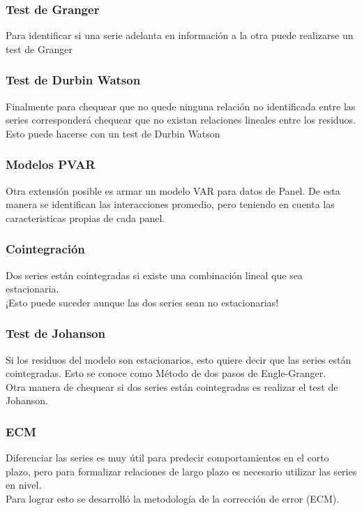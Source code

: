 \documentclass{beamer}
\begin{document}
\begin{frame}
\frametitle{Test de Granger}
Para identificar si una serie adelanta en información a la otra puede realizarse un test de Granger
\end{frame}


\begin{frame}
\frametitle{Test de Durbin Watson}
Finalmente para chequear que no quede ninguna relación no identificada entre las series corresponderá chequear que no existan relaciones lineales entre los residuos. Esto puede hacerse con un test de Durbin Watson 
\end{frame}

\begin{frame}
\frametitle{Modelos PVAR}
Otra extensión posible es armar un modelo VAR para datos de Panel. De esta manera se identifican las interacciones promedio, pero teniendo en cuenta las caracteristicas propias de cada panel. \\
\end{frame}


\begin{frame}
\frametitle{Cointegración}
Dos series están cointegradas si existe una combinación lineal que sea estacionaria.\\
\vspace{5mm} %
¡Esto puede suceder aunque las dos series sean no estacionarias! 
\end{frame}


\begin{frame}
\frametitle{Test de Johanson}
Si los residuos del modelo son estacionarios, esto quiere decir que las series están cointegradas. Esto se conoce como Método de dos pasos de Engle-Granger.  \\
\vspace{5mm} %
Otra manera de chequear si dos series están cointegradas es realizar el test de Johanson. 
\end{frame}



\begin{frame}
\frametitle{ECM}
Diferenciar las series es muy útil para predecir comportamientos en el corto plazo, pero para formalizar relaciones de largo plazo es necesario utilizar las series en nivel.\\
\vspace{5mm} %
Para lograr esto se desarrolló la metodología de la corrección de error (ECM).  
\end{frame}
\end{document}
